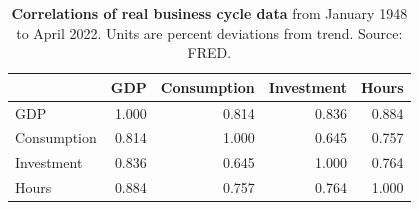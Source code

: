 \begin{table}[h] \caption{\label{tab009_rbc_data_correlations} \textbf{Correlations of real business cycle data} from January 1948 to April 2022. Units are percent deviations from trend. {\tiny Source: FRED}.}
\begin{center}\hspace*{-.5cm}

\begin{tabular}{lrrrr}
\toprule
{} &    GDP &  Consumption &  Investment &  Hours \\
\midrule
GDP         &  1.000 &        0.814 &       0.836 &  0.884 \\
Consumption &  0.814 &        1.000 &       0.645 &  0.757 \\
Investment  &  0.836 &        0.645 &       1.000 &  0.764 \\
Hours       &  0.884 &        0.757 &       0.764 &  1.000 \\
\bottomrule
\end{tabular}
\end{center}
\end{table}